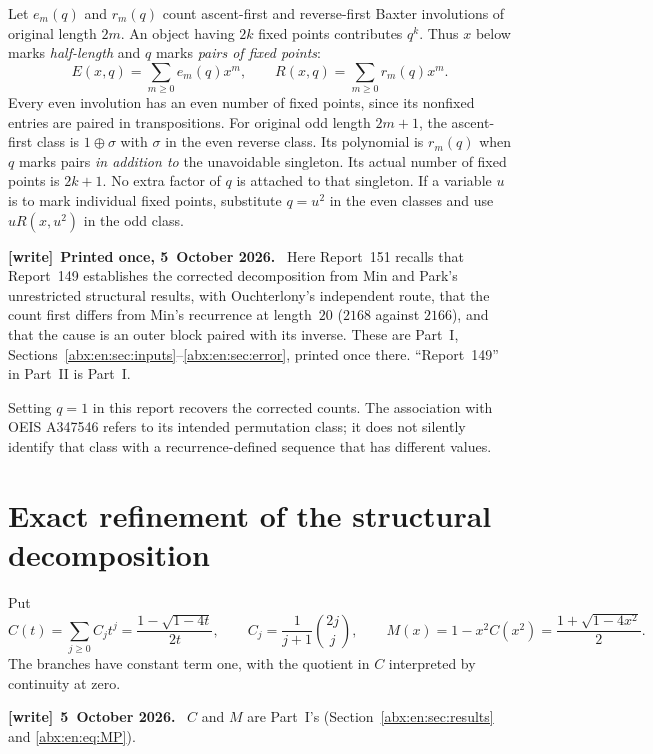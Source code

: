 \documentclass[11pt,letterpaper]{article}
\numberwithin{equation}{section}
\theoremstyle{remark}\newtheorem{remark}[theorem]{Remark}
\newenvironment{writenote}[1][]{\par\smallskip\begingroup\small
 \noindent\textbf{[write]}\if\relax\detokenize{#1}\relax\else~\textbf{#1.}\fi\ }%
 {\par\endgroup\smallskip}
\begin{document}
Let $e_m(q)$ and $r_m(q)$ count ascent-first and reverse-first Baxter
involutions of original length $2m$. An object having $2k$ fixed points
contributes $q^k$. Thus $x$ below marks \emph{half-length} and $q$
marks \emph{pairs of fixed points}:
\[
 E(x,q)=\sum_{m\ge0}e_m(q)x^m,\qquad
 R(x,q)=\sum_{m\ge0}r_m(q)x^m.
\]
Every even involution has an even number of fixed points, since its
nonfixed entries are paired in transpositions. For original odd length
$2m+1$, the ascent-first class is $1\oplus\sigma$ with $\sigma$ in the
even reverse class. Its polynomial is $r_m(q)$ when $q$ marks pairs
\emph{in addition to} the unavoidable singleton. Its actual number of
fixed points is $2k+1$. No extra factor of $q$ is attached to that singleton.
If a variable $u$ is to mark individual fixed points, substitute $q=u^2$
in the even classes and use $uR(x,u^2)$ in the odd class.

\begin{writenote}[Printed once, 5~October 2026]
Here Report~151 recalls that Report~149 \cite{report149} establishes the corrected decomposition from Min and Park's unrestricted structural results, with Ouchterlony's independent route, that the count first differs from Min's recurrence at length~$20$ ($2168$ against $2166$), and that the cause is an outer block paired with its inverse. These are Part~I, Sections~\ref{abx:en:sec:inputs}--\ref{abx:en:sec:error}, printed once there. ``Report~149'' in Part~II is Part~I.
\end{writenote}
Setting
$q=1$ in this report recovers the corrected counts. The association
with OEIS A347546\cite{oeis} refers to its intended permutation class;
it does not silently identify that class with a recurrence-defined
sequence that has different values.

\section{Exact refinement of the structural decomposition}\label{abx:fp:sec:exact}
Put
\begin{equation}\label{abx:fp:eq:catalan}
 C(t)=\sum_{j\ge0}C_jt^j=\frac{1-\sqrt{1-4t}}{2t},\qquad
 C_j=\frac1{j+1}\binom{2j}{j},
 \qquad M(x)=1-x^2C(x^2)=\frac{1+\sqrt{1-4x^2}}2.
\end{equation}
The branches have constant term one, with the quotient in $C$ interpreted
by continuity at zero.

\begin{writenote}[5~October 2026]
$C$ and $M$ are Part~I's (Section~\ref{abx:en:sec:results} and \eqref{abx:en:eq:MP}).
\end{writenote}
\end{document}
